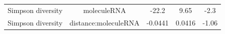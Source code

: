 \documentclass[]{article}
\begin{document}
\begin{longtable}[]{@{}ccccc@{}}
\begin{minipage}[t]{0.21\columnwidth}
Simpson diversity\strut
\end{minipage} & \begin{minipage}[t]{0.25\columnwidth}\centering\strut
moleculeRNA\strut
\end{minipage} & \begin{minipage}[t]{0.12\columnwidth}\centering\strut
-22.2\strut
\end{minipage} & \begin{minipage}[t]{0.14\columnwidth}\centering\strut
9.65\strut
\end{minipage} & \begin{minipage}[t]{0.14\columnwidth}\centering\strut
-2.3\strut
\end{minipage}\tabularnewline
\begin{minipage}[t]{0.21\columnwidth}\centering\strut
Simpson diversity\strut
\end{minipage} & \begin{minipage}[t]{0.25\columnwidth}\centering\strut
distance:moleculeRNA\strut
\end{minipage} & \begin{minipage}[t]{0.12\columnwidth}\centering\strut
-0.0441\strut
\end{minipage} & \begin{minipage}[t]{0.14\columnwidth}\centering\strut
0.0416\strut
\end{minipage} & \begin{minipage}[t]{0.14\columnwidth}\centering\strut
-1.06\strut
\end{minipage}\tabularnewline
\bottomrule
\end{longtable}
\end{document}
